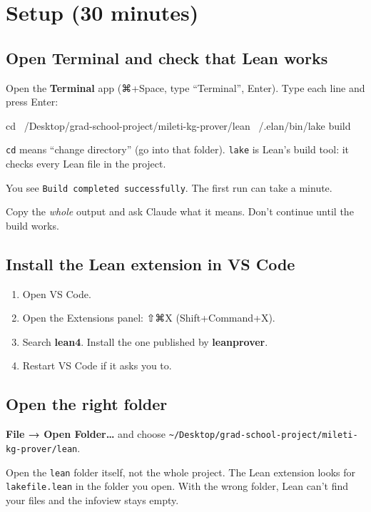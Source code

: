\documentclass[11pt,a4paper]{article}
\newcommand{\code}[1]{\texttt{#1}}
\begin{document}
\section{Setup (30 minutes)}

\subsection{Open Terminal and check that Lean works}
Open the \textbf{Terminal} app (⌘+Space, type ``Terminal'', Enter). Type each line and press Enter:
\begin{shell}
cd ~/Desktop/grad-school-project/mileti-kg-prover/lean
~/.elan/bin/lake build
\end{shell}
\code{cd} means ``change directory'' (go into that folder). \code{lake} is Lean's build tool: it checks every Lean file in the project.
\begin{okbox}
You see \code{Build completed successfully}. The first run can take a minute.
\end{okbox}
\begin{warn}[If it fails]
Copy the \emph{whole} output and ask Claude what it means. Don't continue until the build works.
\end{warn}

\subsection{Install the Lean extension in VS Code}
\begin{enumerate}
\item Open VS Code.
\item Open the Extensions panel: ⇧⌘X (Shift+Command+X).
\item Search \textbf{lean4}. Install the one published by \textbf{leanprover}.
\item Restart VS Code if it asks you to.
\end{enumerate}

\subsection{Open the right folder}
\textbf{File → Open Folder…} and choose
\code{\textasciitilde/Desktop/grad-school-project/mileti-kg-prover/lean}.
\begin{warn}
Open the \code{lean} folder itself, not the whole project. The Lean extension looks for \code{lakefile.lean} in the folder you open. With the wrong folder, Lean can't find your files and the infoview stays empty.
\end{warn}
\end{document}
